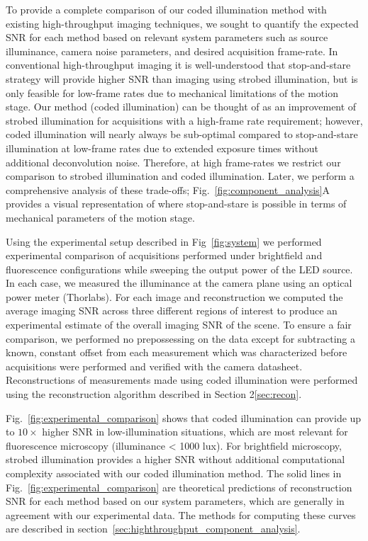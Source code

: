 To provide a complete comparison of our coded illumination method with existing high-throughput imaging techniques, we sought to quantify the expected SNR for each method based on relevant system parameters such as source illuminance, camera noise parameters, and desired acquisition frame-rate. In conventional high-throughput imaging it is well-understood that stop-and-stare strategy will provide higher SNR than imaging using strobed illumination, but is only feasible for low-frame rates due to mechanical limitations of the motion stage. Our method (coded illumination) can be thought of as an improvement of strobed illumination for acquisitions with a high-frame rate requirement; however, coded illumination will nearly always be sub-optimal compared to stop-and-stare illumination at low-frame rates due to extended exposure times without additional deconvolution noise. Therefore, at high frame-rates we restrict our comparison to strobed illumination and coded illumination. Later, we perform a comprehensive analysis of these trade-offs; Fig.~\ref{fig:component_analysis}A provides a visual representation of where stop-and-stare is possible in terms of mechanical parameters of the motion stage.

Using the experimental setup described in Fig~\ref{fig:system} we performed experimental comparison of acquisitions performed under brightfield and fluorescence configurations while sweeping the output power of the LED source. In each case, we measured the illuminance at the camera plane using an optical power meter (Thorlabs). For each image and reconstruction we computed the average imaging SNR across three different regions of interest to produce an experimental estimate of the overall imaging SNR of the scene. To ensure a fair comparison, we performed no prepossessing on the data except for subtracting a known, constant offset from each measurement which was characterized before acquisitions were performed and verified with the camera datasheet. Reconstructions of measurements made using coded illumination were performed using the reconstruction algorithm described in Section 2\ref{sec:recon}.

Fig.~\ref{fig:experimental_comparison} shows that coded illumination can provide up to $10\times$ higher SNR in low-illumination situations, which are most relevant for fluorescence microscopy (illuminance < 1000 lux). For brightfield microscopy, strobed illumination provides a higher SNR without additional computational complexity associated with our coded illumination method. The solid lines in Fig.~\ref{fig:experimental_comparison} are theoretical predictions of reconstruction SNR for each method based on our system parameters, which are generally in agreement with our experimental data. The methods for computing these curves are described in section~\ref{sec:highthroughput_component_analysis}.

